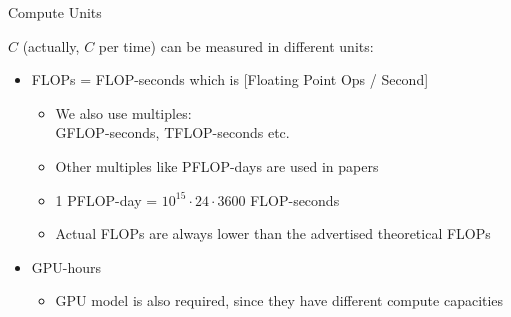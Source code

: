 \documentclass[11pt,compress,t,notes=noshow, xcolor=table]{beamer}
\begin{document}
\begin{vbframe}{Compute Units}

\vfill

$C$ (actually, $C$ per time) can be measured in different units:\newline

\begin{itemize}
     \item FLOPs = FLOP-seconds which is [Floating Point Ops / Second] 
 	\begin{itemize}
 	    \item We also use multiples:\\ GFLOP-seconds, TFLOP-seconds etc.
 		\item Other multiples like PFLOP-days are used in papers
 		\item 1 PFLOP-day = $10^{15} \cdot 24 \cdot 3600$ FLOP-seconds
            \item Actual FLOPs are always lower than the advertised theoretical FLOPs
 	\end{itemize}
 	\item GPU-hours
 	\begin{itemize}
 	    \item GPU model is also required, since they have different compute capacities
 	\end{itemize}
 \end{itemize}

 \vfill

\end{vbframe}

\end{document}
